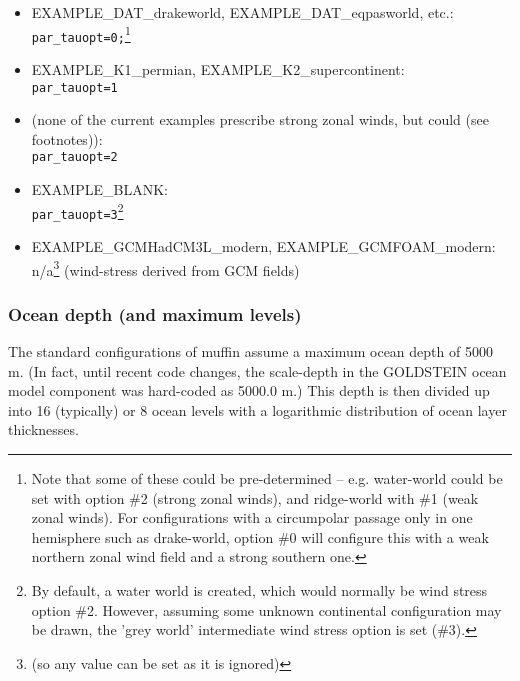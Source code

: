 \documentclass[11pt,fleqn]{book} %
\begin{document}
\vspace{1mm}
\begin{itemize}
\item \textsf{\footnotesize EXAMPLE\_DAT\_drakeworld}, \textsf{\footnotesize EXAMPLE\_DAT\_eqpasworld}, etc.:
\\\texttt{par\_tauopt=0;}\footnote{Note that some of these could be pre-determined -- e.g. water-world could be set with option \#2 (strong zonal winds), and ridge-world with \#1 (weak zonal winds). For configurations with a circumpolar passage only in one hemisphere such as drake-world, option \#0 will configure this with a weak northern zonal wind field and a strong southern one.}
\item \textsf{\footnotesize EXAMPLE\_K1\_permian}, \textsf{\footnotesize EXAMPLE\_K2\_supercontinent}:
\\\texttt{par\_tauopt=1}
\item (none of the current examples prescribe strong zonal winds, but could (see footnotes)):
\\\texttt{par\_tauopt=2}
\item \textsf{\footnotesize EXAMPLE\_BLANK}:
\\\texttt{par\_tauopt=3}\footnote{By default, a water world is created, which would normally be wind stress option \#2. However, assuming some unknown continental configuration may be drawn, the 'grey world' intermediate wind stress option is set (\#3).}
\item \textsf{\footnotesize EXAMPLE\_GCMHadCM3L\_modern}\normalsize, \textsf{\footnotesize EXAMPLE\_GCMFOAM\_modern}\normalsize:
\\n/a\footnote{(so any value can be set as it is ignored)} (wind-stress derived from GCM fields)
\end{itemize}
\vspace{1mm}


\subsubsection{Ocean depth (and maximum levels)}

The standard configurations of muffin assume a maximum ocean depth of 5000 m. (In fact, until recent code changes, the scale-depth in the GOLDSTEIN ocean model component was hard-coded as 5000.0 m.) This depth is then divided up into 16 (typically) or 8 ocean levels with a logarithmic distribution of ocean layer thicknesses.
\end{document}
